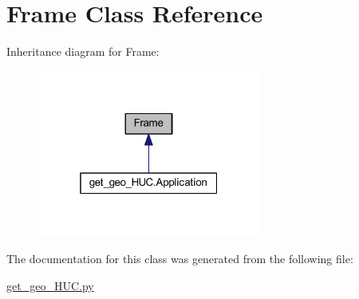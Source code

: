 \hypertarget{class_frame}{}\section{Frame Class Reference}
\label{class_frame}


Inheritance diagram for Frame\+:
\nopagebreak
\begin{figure}[H]
\begin{center}
\leavevmode
\includegraphics[width=208pt]{class_frame__inherit__graph}
\end{center}
\end{figure}


The documentation for this class was generated from the following file\+:\begin{DoxyCompactItemize}
\item 
\hyperlink{get__geo___h_u_c_8py}{get\+\_\+geo\+\_\+\+H\+U\+C.\+py}\end{DoxyCompactItemize}
